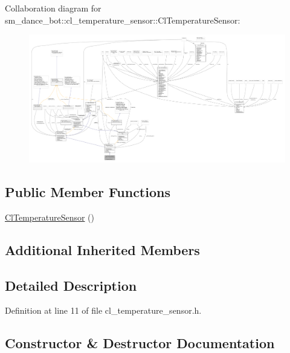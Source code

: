 Collaboration diagram for sm\+\_\+dance\+\_\+bot\+:\+:cl\+\_\+temperature\+\_\+sensor\+:\+:Cl\+Temperature\+Sensor\+:\nopagebreak
\begin{figure}[H]
\begin{center}
\leavevmode
\includegraphics[width=350pt]{classsm__dance__bot_1_1cl__temperature__sensor_1_1ClTemperatureSensor__coll__graph}
\end{center}
\end{figure}
\subsection*{Public Member Functions}
\begin{DoxyCompactItemize}
\item 
\hyperlink{classsm__dance__bot_1_1cl__temperature__sensor_1_1ClTemperatureSensor_ac2e5d27f5110bc19393890214429d0bf}{Cl\+Temperature\+Sensor} ()
\end{DoxyCompactItemize}
\subsection*{Additional Inherited Members}


\subsection{Detailed Description}


Definition at line 11 of file cl\+\_\+temperature\+\_\+sensor.\+h.



\subsection{Constructor \& Destructor Documentation}
